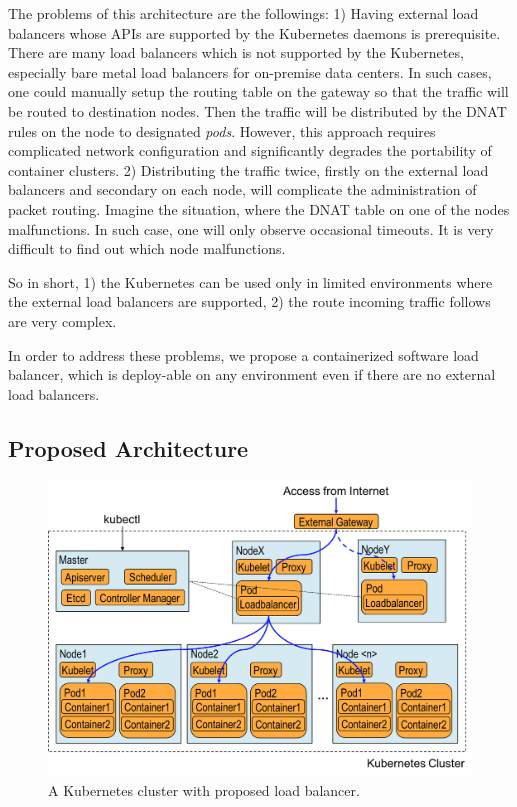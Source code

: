 The problems of this architecture are the followings: 
1) Having external load balancers whose APIs are supported by the Kubernetes daemons is prerequisite. 
There are many load balancers which is not supported by the Kubernetes,
especially bare metal load balancers for on-premise data centers.  
In such cases, one could manually setup the routing table on the gateway so that the traffic will be routed to destination nodes.
Then the traffic will be distributed by the DNAT rules on the node to designated {\em pods}.
However, this approach requires complicated network configuration and significantly degrades the portability of container clusters.
2) Distributing the traffic twice, firstly on the external load balancers and secondary on each node, 
will complicate the administration of packet routing. 
Imagine the situation, where the DNAT table on one of the nodes malfunctions.
In such case, one will only observe occasional timeouts. It is very difficult to find out which node malfunctions.   

So in short, 1) the Kubernetes can be used only in limited environments where the external load balancers are supported, 
2) the route incoming traffic follows are very complex.

In order to address these problems, we propose a containerized software load balancer, 
which is deploy-able on any environment even if there are no external load balancers.

\subsection{Proposed Architecture}

\begin{figure}
\includegraphics[width=\columnwidth]{Figs/K8sProposed}
\caption{A Kubernetes cluster with proposed load balancer.}
\label{fig:K8sProposed}
\end{figure}

